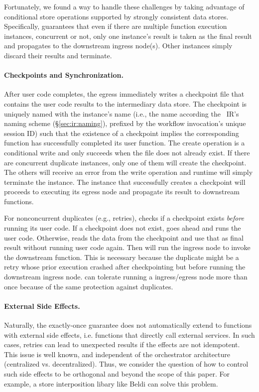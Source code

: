 Fortunately, we found a way to handle these challenges by taking advantage of
conditional store operations supported by strongly consistent data stores.
Specifically, \name{} guarantees that even if there are multiple function
execution instances, concurrent or not, only one instance's result is taken as
the final result and propagates to the downstream ingress node(s). Other
instances simply discard their results and terminate.

\paragraph{Checkpoints and Synchronization.}%
After user code completes, the \name{} egress immediately writes a checkpoint
file that contains the user code results to the intermediary data store. The
checkpoint is uniquely named with the instance's name (i.e., the name
according the
\name{}~IR's naming scheme (\S\ref{sec:ir:naming}), prefixed by the workflow
invocation's unique session ID) such that the existence of a checkpoint
implies the corresponding function has successfully completed its user
function. The create operation is a conditional write and only succeeds when
the file does not already exist. If there are concurrent duplicate instances,
only one of them will create the checkpoint. The others will receive an error
from the write operation and \name{} runtime will simply terminate the
instance. The instance that successfully creates a checkpoint will proceeds to
executing its egress node and propagate its result to downstream functions.

For nonconcurrent duplicates (e.g., retries), \name{} checks if a checkpoint
exists \emph{before} running its user code. If a checkpoint does not exist,
\name{} goes ahead and runs the user code. Otherwise, \name{} reads the data
from the checkpoint and use that as final result without running user code
again. Then \name{} will run the ingress node to invoke the downstream function.
This is necessary because the duplicate might be a retry whose prior execution
crashed after checkpointing but before running the downstream ingress node. \name{} can
tolerate running a ingress/egress node more than once because of the same protection
against duplicates.

\paragraph{External Side Effects.} Naturally, the
exactly-once guarantee does not automatically extend to functions with
external side effects, i.e. functions that directly call external services. In
such cases, retries can lead to unexpected results if the effects are not
idempotent. This issue is well known, and independent of the orchestrator
architecture (centralized vs. decentralized). Thus, we consider the question
of how to control such side effects to be orthogonal and beyond the scope of
this paper. For example, a store interposition libary like Beldi \cite{beldi}
can solve this problem.
